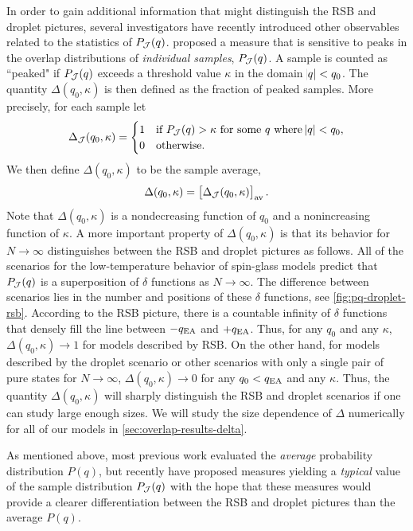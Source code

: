 In order to gain additional information that might distinguish the RSB and
droplet pictures, several investigators have recently introduced other
observables related to the statistics of $P_{\mathcal{J}}(q)$.
\textcite{yucesoy2012evidence} proposed a measure that is sensitive to peaks in
the overlap distributions of \emph{individual samples}, $P_{\mathcal{J}}(q)$. A
sample is counted as ``peaked" if $P_{\mathcal{J}}(q)$ exceeds a threshold value
$\kappa$ in the domain $\abs{q} < q_0$. The quantity $\Delta(q_0,\kappa)$ is
then defined as the fraction of peaked samples. More precisely, for each sample
let
\begin{equation}
  \Delta_{\mathcal{J}}(q_0,\kappa) =
  \begin{cases}
    1 & \text{if $P_{\mathcal{J}}(q)>\kappa$ for some $q$ where $\abs{q}<q_0$}, \\
    0 & \text{otherwise.}
  \end{cases}
  \label{eq:delta-sample}
\end{equation}
We then define $\Delta(q_0,\kappa)$ to be the sample average,
\begin{equation}
  \Delta(q_0,\kappa) = \left[\Delta_{\mathcal{J}}(q_0,\kappa)\right]_{\mathrm{av}}.
  \label{eq:delta-average}
\end{equation}
Note that $\Delta(q_0,\kappa)$ is a nondecreasing function of $q_0$ and a
nonincreasing function of $\kappa$. A more important property of
$\Delta(q_0,\kappa)$ is that its behavior for $N \to \infty$ distinguishes
between the RSB and droplet pictures as follows. All of the scenarios for the
low-temperature behavior of spin-glass models predict that $P_{\mathcal{J}}(q)$ is a
superposition of $\delta$ functions as $N \to \infty$. The difference between
scenarios lies in the number and positions of these $\delta$ functions, see
\cref{fig:pq-droplet-rsb}. According to the RSB picture, there is a countable
infinity of $\delta$ functions that densely fill the line between $-q_{\mathrm{EA}}$ and
$+q_{\mathrm{EA}}$. Thus, for any $q_0$ and any $\kappa$, $\Delta(q_0,\kappa) \to 1$ for
models described by RSB. On the other hand, for models described by the droplet
scenario or other scenarios with only a single pair of pure states for $N \to
\infty$, $\Delta(q_0,\kappa) \to 0$ for any $q_0<q_{\mathrm{EA}}$ and any $\kappa$. Thus,
the quantity $\Delta(q_0,\kappa)$ will sharply distinguish the RSB and droplet
scenarios if one can study large enough sizes. We will study the size
dependence of $\Delta$ numerically for all of our models in
\cref{sec:overlap-results-delta}.

As mentioned above, most previous work evaluated the \emph{average} probability
distribution $P(q)$, but recently
\textcite{middleton2013extracting,monthus2013typical}
have proposed measures yielding a \emph{typical} value of the sample
distribution $P_{\mathcal{J}}(q)$ with the hope that these measures would provide a
clearer differentiation between the RSB and droplet pictures than the average
$P(q)$.

